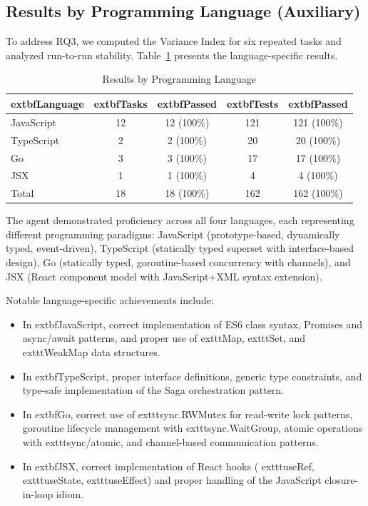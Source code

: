 \documentclass[conference]{IEEEtran}
\begin{document}
\subsection{Results by Programming Language (Auxiliary)}

To address RQ3, we computed the Variance Index for six repeated tasks and analyzed run-to-run stability. Table~\ref{tab:by_language} presents the language-specific results.

\begin{table}[h]
\centering
\caption{Results by Programming Language}
\label{tab:by_language}
\small
\begin{tabular}{@{}lcccc@{}}
\toprule
			extbf{Language} & 			extbf{Tasks} & 			extbf{Passed} & 			extbf{Tests} & 			extbf{Passed} \\
\midrule
JavaScript & 12 & 12 (100\%) & 121 & 121 (100\%) \\
TypeScript & 2 & 2 (100\%) & 20 & 20 (100\%) \\
Go & 3 & 3 (100\%) & 17 & 17 (100\%) \\
JSX & 1 & 1 (100\%) & 4 & 4 (100\%) \\
\midrule
Total & 18 & 18 (100\%) & 162 & 162 (100\%) \\
\bottomrule
\end{tabular}
\end{table}

The agent demonstrated proficiency across all four languages, each representing different programming paradigms: JavaScript (prototype-based, dynamically typed, event-driven), TypeScript (statically typed superset with interface-based design), Go (statically typed, goroutine-based concurrency with channels), and JSX (React component model with JavaScript+XML syntax extension).

Notable language-specific achievements include:
\begin{itemize}[leftmargin=*]
 \item In 			extbf{JavaScript}, correct implementation of ES6 class syntax, Promises and async/await patterns, and proper use of 			exttt{Map}, 			exttt{Set}, and 			exttt{WeakMap} data structures.
 \item In 			extbf{TypeScript}, proper interface definitions, generic type constraints, and type-safe implementation of the Saga orchestration pattern.
 \item In 			extbf{Go}, correct use of 			exttt{sync.RWMutex} for read-write lock patterns, goroutine lifecycle management with 			exttt{sync.WaitGroup}, atomic operations with 			exttt{sync/atomic}, and channel-based communication patterns.
 \item In 			extbf{JSX}, correct implementation of React hooks (			exttt{useRef}, 			exttt{useState}, 			exttt{useEffect}) and proper handling of the JavaScript closure-in-loop idiom.
\end{itemize}
\end{document}
